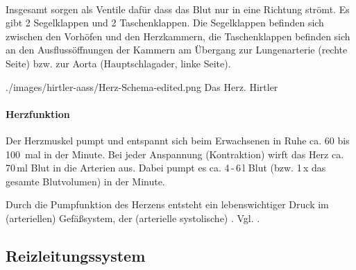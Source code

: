 ~


{

Insgesamt  sorgen als Ventile dafür dass das Blut nur in eine Richtung
strömt. Es gibt 2 Segelklappen und 2 Taschenklappen. Die Segelklappen befinden
sich zwischen den Vorhöfen und den Herzkammern, die Taschenklappen befinden sich an den
Ausflussöffnungen der Kammern am Übergang zur Lungenarterie (rechte
Seite) bzw. zur  Aorta (Hauptschlagader, linke Seite). 
}
{}
{./images/hirtler-aass/Herz-Schema-edited.png}
{Das
 Herz.}
 {Hirtler}







 


\paragraph{Herzfunktion}\label{topic:herzfunktion}

Der Herzmuskel pumpt und entspannt sich beim Erwachsenen
in Ruhe ca. 60 bis 100~mal in der Minute. Bei jeder
Anspannung (Kontraktion) wirft das Herz ca. 70\,ml Blut in die Arterien
aus. Dabei pumpt es ca. 4\,-\,6\,l  Blut (bzw. 1\,x das
gesamte Blutvolumen) in der Minute.

Durch die Pumpfunktion des Herzens entsteht ein
lebenswichtiger Druck im (arteriellen) Gefäßsystem, der
(arterielle systolische)  .
Vgl. . 

%
%
\subsection{Reizleitungssystem}



